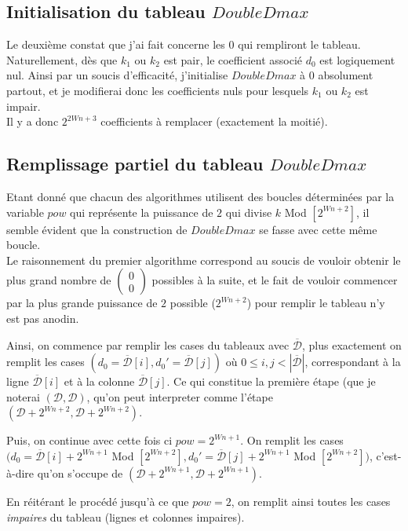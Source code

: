 \documentclass[12pt, a4paper]{memoir}
\newcommand{\doublezero}{\begin{pmatrix} 0 \\ 0 \end{pmatrix}}
\newcommand{\dbarre}{\overline{\mathcal{D}}}
\begin{document}
    \subsection{Initialisation du tableau $DoubleDmax$}
      
      Le deuxième constat que j'ai fait concerne les $0$ qui rempliront le tableau. \\
      Naturellement, dès que $k_1$ ou $k_2$ est pair, le coefficient associé $d_0$ est logiquement nul.
      Ainsi par un soucis d'efficacité, j'initialise $DoubleDmax$ à $0$ absolument partout, et je modifierai donc les coefficients
      nuls pour lesquels $k_1$ ou $k_2$ est impair. \\
      Il y a donc $2^{2Wn+3}$ coefficients à remplacer (exactement la moitié).
	
    \subsection{Remplissage partiel du tableau $DoubleDmax$}
	
      Etant donné que chacun des algorithmes utilisent des boucles déterminées par la variable $pow$ qui représente la puissance de $2$
      qui divise $k$ Mod $[2^{Wn+2}]$, il semble évident que la construction de $DoubleDmax$ se fasse avec cette même boucle. \\
      Le raisonnement du premier algorithme correspond au soucis de vouloir obtenir le plus grand nombre de $\doublezero$ possibles à la suite,
      et le fait de vouloir commencer par la plus grande puissance de $2$ possible ($2^{Wn+2}$) pour remplir le tableau n'y est pas anodin.

      Ainsi, on commence par remplir les cases du tableaux avec $\dbarre$, plus exactement on remplit les cases
      $(d_0 = \dbarre[i],d_0' = \dbarre[j])$ où $0 \leq i,j < |\dbarre|$, correspondant à la ligne $\dbarre[i]$ et à la colonne $\dbarre[j]$.
      Ce qui constitue la première étape (que je noterai $(\mathcal{D},\mathcal{D})$, qu'on peut interpreter comme l'étape $(\mathcal{D}+2^{Wn+2},\mathcal{D}+2^{Wn+2})$.

      Puis, on continue avec cette fois ci $pow = 2^{Wn+1}$. On remplit les cases $(d_0 = \dbarre[i] + 2^{Wn+1}$ Mod $[2^{Wn+2}] ,d_0' = \dbarre[j] + 2^{Wn+1}$  Mod $[2^{Wn+2}])$,
      c'est-à-dire qu'on s'occupe de $(\mathcal{D}+2^{Wn+1},\mathcal{D}+2^{Wn+1})$.
      
      En réitérant le procédé jusqu'à ce que $pow = 2$, on remplit ainsi toutes les cases \emph{impaires} du tableau (lignes et colonnes impaires).
      
\end{document}
